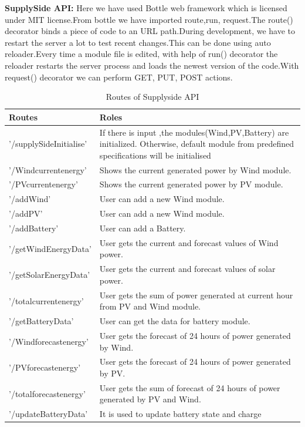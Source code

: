 \documentclass[runningheads]{llncs}
\begin{document}
{\raggedleft \textbf{SupplySide API:}}
Here we have used Bottle  web framework which is licensed under MIT license.From bottle we have imported  route,run, request.\cite{bottlepy}The route() decorator binds a piece of code to an URL path.During development, we have to restart the server a lot to test recent changes.This can be done using auto reloader.Every time a module file is edited, with help of run() decorator the reloader restarts the server process and loads the newest version of the code.With request() decorator we can perform  GET, PUT, POST actions.
\begin{table}[H]
\centering
\caption{Routes of Supplyside API}\label{tab1}
\begin{tabular}{|p{3.5 cm}|p{8.5 cm}|}
\hline
\textbf{Routes} & \textbf{Roles} \\
\hline
'/supplySideInitialise' & If there is input ,the modules(Wind,PV,Battery) are initialized. Otherwise, default module from predefined specifications will be initialised\\
\hline
'/Windcurrentenergy' & Shows the  current generated power by Wind module.\\
\hline
'/PVcurrentenergy' & Shows the  current generated power by PV module.\\
\hline
'/addWind' & User can add a new Wind module.\\
\hline
'/addPV' & User can add a new Wind module.\\
\hline
'/addBattery'  & User can add a Battery.\\
\hline
'/getWindEnergyData' & User gets the  current and forecast  values of Wind power.\\
\hline
'/getSolarEnergyData' & User gets the  current and forecast  values of solar power.\\
\hline
'/totalcurrentenergy'  & User gets the sum of power generated at current  hour from PV and Wind  module.\\
\hline
'/getBatteryData' & User can get the data for battery module.\\
\hline
'/Windforecastenergy'  & User  gets the forecast of 24 hours of power generated by Wind.\\
\hline
'/PVforecastenergy' & User gets the forecast of 24 hours of power generated by PV.\\
\hline
'/totalforecastenergy' & User gets  the sum of forecast of 24 hours of power generated by PV and Wind.\\
\hline'/updateBatteryData' & It  is used to update battery state and  charge\\
\hline
\end{tabular}
\end{table}
\end{document}
